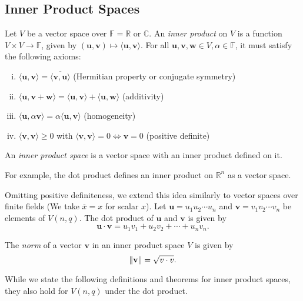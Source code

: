 \subsection{Inner Product Spaces}
\begin{definition}
    Let $V$ be a vector space over $\mathbb{F}=\mathbb{R}$ or $\mathbb{C}$. An \textit{inner product} on $V$ is a function $V\times V\to\mathbb{F}$, given by $(\textbf{u},\textbf{v})\mapsto \langle \textbf{u},\textbf{v}\rangle$. For all $\textbf{u},\textbf{v},\textbf{w}\in V,\alpha\in\mathbb{F}$, it must satisfy the following axioms:
    
    \begin{enumerate}[(i)]
        \item $\langle \textbf{u},\textbf{v}\rangle = \overline{\langle \textbf{v},\textbf{u}\rangle}$ \quad(Hermitian property or conjugate symmetry)
        \item $\langle \textbf{u}, \textbf{v}+\textbf{w}\rangle = \langle \textbf{u},\textbf{v}\rangle + \langle \textbf{u},\textbf{w}\rangle$ \quad(additivity)
        \item $\langle \textbf{u},\alpha\textbf{v}\rangle = \alpha\langle \textbf{u},\textbf{v}\rangle$ \quad(homogeneity)
        \item $\langle \textbf{v},\textbf{v}\rangle\geq 0$ with $\langle \textbf{v},\textbf{v}\rangle=0\iff \textbf{v}=0$ \quad(positive definite)
    \end{enumerate}
\end{definition}

An \textit{inner product space} is a vector space with an inner product defined on it.

For example, the dot product defines an inner product on $\mathbb{R}^n$ as a vector space.

\vspace{2mm}
Omitting positive definiteness, we extend this idea similarly to vector spaces over finite fields (We take $\overline x=x$ for scalar $x$). Let $\textbf{u}=u_1u_2\cdots u_n$ and $\textbf{v}=v_1v_2\cdots v_n$ be elements of $V(n,q)$. The dot product of $\textbf{u}$ and $\textbf{v}$ is given by
$$\textbf{u}\cdot \textbf{v}=u_1v_1+u_2v_2+\cdots+u_nv_n.$$

\begin{definition}
    The \textit{norm} of a vector $\textbf{v}$ in an inner product space $V$ is given by $$\left\lVert\textbf{v}\right\rVert=\sqrt{v\cdot v}.$$
\end{definition}

While we state the following definitions and theorems for inner product spaces, they also hold for $V(n,q)$ under the dot product.

